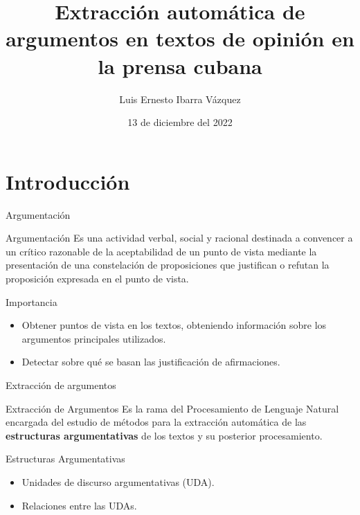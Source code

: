\documentclass{beamer}
\title{Extracción automática de argumentos en textos de opinión en la prensa cubana}
\author{Luis Ernesto Ibarra Vázquez}
\institute{Universidad de La Habana}
\date{13 de diciembre del 2022}
\begin{document}
\begin{frame}
    \titlepage 
\end{frame}

\logo{}

\section{Introducción}
\begin{frame}{Argumentación}
    \begin{block}{Argumentación}
        Es una actividad verbal, social y racional destinada a convencer
        a un crítico razonable de la aceptabilidad de un punto de vista mediante la presentación 
        de una constelación de proposiciones que justifican o refutan la proposición
        expresada en el punto de vista.
    \end{block}
    \pause
    \begin{block}{Importancia}
        \begin{itemize}
            \pause
            \item Obtener puntos de vista en los textos, obteniendo información sobre 
            los argumentos principales utilizados.
            \pause
            \item Detectar sobre qué se basan las justificación de 
            afirmaciones. 
        \end{itemize}
    \end{block}
\end{frame}

\begin{frame}{Extracción de argumentos}
    \begin{block}{Extracción de Argumentos}
        \pause 
        Es la rama del Procesamiento de Lenguaje Natural encargada del
        estudio de métodos para la extracción automática de las \textbf{estructuras argumentativas}
        de los textos y su posterior procesamiento.
    \end{block}
    \pause 
    \begin{block}{Estructuras Argumentativas}
        \begin{itemize}
            \pause
            \item Unidades de discurso argumentativas (UDA).
            \pause
            \item Relaciones entre las UDAs.
        \end{itemize}
    \end{block}
\end{frame}
\end{document}
